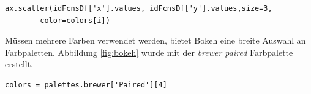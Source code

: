  \begin{lstlisting}[caption={Bsp.: Bokeh Scatter-Plot}, captionpos=b, label={lst:plot}]
 	ax.scatter(idFcnsDf['x'].values, idFcnsDf['y'].values,size=3,
 		color=colors[i])
 \end{lstlisting}
 
 Müssen mehrere Farben verwendet werden, bietet Bokeh eine breite Auswahl an Farbpaletten. Abbildung \ref{fig:bokeh} wurde mit der \textit{brewer paired} Farbpalette erstellt. 
 \begin{lstlisting}[caption={Bokeh Farb-Palette}, captionpos=b, label={lst:brewer color}]
 	colors = palettes.brewer['Paired'][4]   
 \end{lstlisting}
 